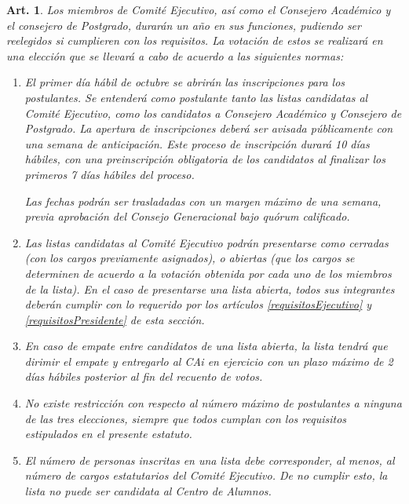 \documentclass[letterpaper,11pt]{article}
\theoremstyle{plain}
\newtheorem{art}{Art.} %
\begin{document}
		\begin{art}\label{eleccionesCAi}
			Los miembros de Comité Ejecutivo, así como el Consejero Académico y el consejero de Postgrado, durarán un año en sus funciones, pudiendo ser reelegidos si cumplieren con los requisitos. La votación de estos se realizará en una elección que se llevará a cabo de acuerdo a las siguientes normas:
			\begin{enumerate}
				\item El primer día hábil de octubre se abrirán las inscripciones para los postulantes. Se entenderá como postulante tanto las listas candidatas al Comité Ejecutivo, como los candidatos a Consejero Académico y Consejero de Postgrado. La apertura de inscripciones deberá ser avisada públicamente con una semana de anticipación. Este proceso de inscripción durará 10 días hábiles, con una preinscripción obligatoria de los candidatos al finalizar los primeros 7 días hábiles del proceso.

				Las fechas podrán ser trasladadas con un margen máximo de una semana, previa aprobación del \emph{Consejo Generacional} bajo quórum calificado.
				
				\item Las listas candidatas al Comité Ejecutivo podrán presentarse como cerradas (con los cargos previamente asignados), o abiertas (que los cargos se determinen de acuerdo a la votación obtenida por cada uno de los miembros de la lista). En el caso de presentarse una lista abierta, todos sus integrantes deberán cumplir con lo requerido por los artículos \ref{requisitosEjecutivo} y \ref{requisitosPresidente} de esta sección.
				
				\item En caso de empate entre candidatos de una lista abierta, la lista tendrá que dirimir el empate y entregarlo al CAi en ejercicio con un plazo máximo de 2 días hábiles posterior al fin del recuento de votos.
				
				\item No existe restricción con respecto al número máximo de postulantes a ninguna de las tres elecciones, siempre que todos cumplan con los requisitos estipulados en el presente estatuto.
				
				\item El número de personas inscritas en una lista debe corresponder, al menos, al número de cargos estatutarios del Comité Ejecutivo. De no cumplir esto, la lista no puede ser candidata al Centro de Alumnos.


\end{enumerate}
\end{art}
\end{document}
